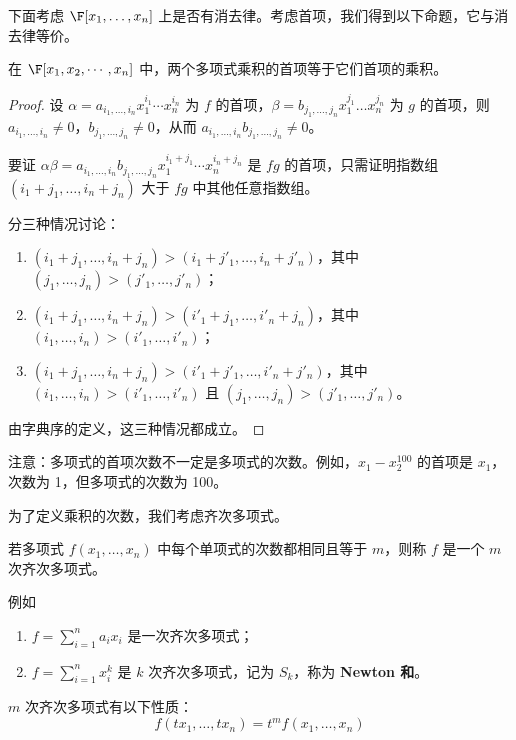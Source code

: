 下面考虑 \( \F[x_1,\dots,x_n] \) 上是否有消去律。考虑首项，我们得到以下命题，它与消去律等价。
\begin{proposition}
	在 \( \F[x_1,x_2,\cdots,x_n] \) 中，两个多项式乘积的首项等于它们首项的乘积。
\end{proposition}
\begin{proof}
	设 \( \alpha = a_{i_1,\dots,i_n} x_1^{i_1} \cdots x_n^{i_n} \) 为 \( f \) 的首项，\( \beta = b_{j_1,\dots,j_n} x_1^{j_1} \dots x_n^{j_n} \) 为 \( g \) 的首项，则 \( a_{i_1,\dots,i_n} \neq 0 \)，\( b_{j_1,\dots,j_n} \neq 0 \)，从而 \( a_{i_1,\dots,i_n} b_{j_1,\dots,j_n} \neq 0 \)。
	
	要证 \( \alpha\beta = a_{i_1,\dots,i_n} b_{j_1,\dots,j_n} x_1^{i_1+j_1} \cdots x_n^{i_n+j_n} \) 是 \( fg \) 的首项，只需证明指数组 \( (i_1+j_1,\dots,i_n+j_n) \) 大于 \( fg \) 中其他任意指数组。
	
	分三种情况讨论：
	\begin{enumerate}
		\item \( (i_1+j_1,\dots,i_n+j_n) > (i_1+j'_1,\dots,i_n+j'_n) \)，其中 \( (j_1,\dots,j_n) > (j'_1,\dots,j'_n) \)；
		\item \( (i_1+j_1,\dots,i_n+j_n) > (i'_1+j_1,\dots,i'_n+j_n) \)，其中 \( (i_1,\dots,i_n) > (i'_1,\dots,i'_n) \)；
		\item \( (i_1+j_1,\dots,i_n+j_n) > (i'_1+j'_1,\dots,i'_n+j'_n) \)，其中 \( (i_1,\dots,i_n) > (i'_1,\dots,i'_n) \) 且 \( (j_1,\dots,j_n) > (j'_1,\dots,j'_n) \)。
	\end{enumerate}
	
	由字典序的定义，这三种情况都成立。
\end{proof}


注意：多项式的首项次数不一定是多项式的次数。例如，\( x_1 - x_2^{100} \) 的首项是 \( x_1 \)，次数为 1，但多项式的次数为 100。

为了定义乘积的次数，我们考虑齐次多项式。



\begin{definition}
	若多项式 \( f(x_1,\dots,x_n) \) 中每个单项式的次数都相同且等于 \( m \)，则称 \( f \) 是一个 \( m \) 次齐次多项式。
\end{definition}
例如
\begin{enumerate}
	\item \( f = \sum\limits_{i=1}^n a_i x_i \) 是一次齐次多项式；
	\item\( f = \sum\limits_{i=1}^n x_i^k \) 是 \( k \) 次齐次多项式，记为 \( S_k \)，称为 \textbf{Newton 和}。  
\end{enumerate}
\( m \) 次齐次多项式有以下性质：
\[
f(tx_1,\dots,tx_n) = t^m f(x_1,\dots,x_n)
\]

